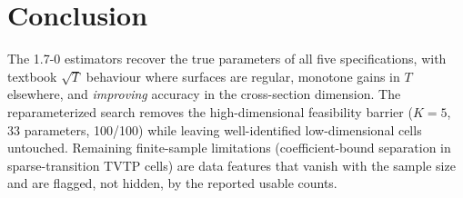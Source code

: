 \documentclass[11pt]{article}
\begin{document}
\section{Conclusion}
The 1.7-0 estimators recover the true parameters of all five
specifications, with textbook $\sqrt{T}$ behaviour where surfaces are
regular, monotone gains in $T$ elsewhere, and \emph{improving} accuracy in
the cross-section dimension. The reparameterized search removes the
high-dimensional feasibility barrier ($K = 5$, 33 parameters, 100/100)
while leaving well-identified low-dimensional cells untouched. Remaining
finite-sample limitations (coefficient-bound separation in sparse-transition
TVTP cells) are data features that vanish with the sample size and are
flagged, not hidden, by the reported usable counts.
\end{document}
